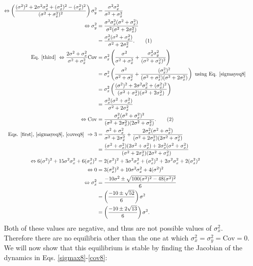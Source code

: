 \documentclass{article}
\newcommand{\Cov}{\text{Cov}}
\newcommand\numberthis{\addtocounter{equation}{1}\tag{\theequation}}
\begin{document}
\begin{enumerate}
\begin{align*}
\\\Leftrightarrow \left(\frac{(\sigma^2)^2+2\sigma^2\sigma_x^2+(\sigma_x^2)^2-(\sigma_x^2)^2}{(\sigma^2+\sigma_x^2)^2}\right)\sigma_y^2&=\frac{\sigma^2\sigma_x^2}{\sigma^2+\sigma_x^2}
\\ \Leftrightarrow \sigma_y^2&=\frac{\sigma^2\sigma_x^2(\sigma^2+\sigma_x^2)}{\sigma^2(\sigma^2+2\sigma_x^2)}
\\&=\frac{\sigma_x^2(\sigma^2+\sigma_x^2)}{\sigma^2+2\sigma_x^2}.  \numberthis \label{sigmayeq8}
\\ \text{Eq. \ref{third} } \Leftrightarrow \frac{2\sigma^2+\sigma_x^2}{\sigma^2+\sigma_x^2}\Cov&=\sigma_x^2\left(\frac{\sigma^2}{\sigma^2+\sigma_x^2}+\frac{\sigma_x^2\sigma_y^2}{(\sigma^2+\sigma_x^2)^2}\right)
\\ &=\sigma_x^2\left(\frac{\sigma^2}{\sigma^2+\sigma_x^2}+\frac{(\sigma_x^2)^2}{(\sigma^2+\sigma_x^2)(\sigma^2+2\sigma_x^2)}\right)  \text{ using Eq. \ref{sigmayeq8}}
\\&=\sigma_x^2\left(\frac{(\sigma^2)^2+2\sigma^2\sigma_x^2+(\sigma_x^2)^2}{(\sigma^2+\sigma_x^2)(\sigma^2+2\sigma_x^2)}\right)
\\&=\frac{\sigma_x^2(\sigma^2+\sigma_x^2)}{\sigma^2+2\sigma_x^2}
\\ \Leftrightarrow \Cov&=\frac{\sigma_x^2(\sigma^2+\sigma_x^2)^2}{(\sigma^2+2\sigma_x^2)(2\sigma^2+\sigma_x^2)}.  \numberthis \label{coveq8}
\\\text{Eqs. \ref{first}, \ref{sigmayeq8}, \ref{coveq8} } \Rightarrow 3&=\frac{\sigma^2+\sigma_x^2}{\sigma^2+2\sigma_x^2}+\frac{2\sigma_x^2(\sigma^2+\sigma_x^2)}{(\sigma^2+2\sigma_x^2)(2\sigma^2+\sigma_x^2)}
\\&=\frac{(\sigma^2+\sigma_x^2)(2\sigma^2+\sigma_x^2)+2\sigma_x^2(\sigma^2+\sigma_x^2)}{(\sigma^2+2\sigma_x^2)(2\sigma^2+\sigma_x^2)}
\\\Leftrightarrow 6(\sigma^2)^2+15\sigma^2\sigma_x^2+6(\sigma_x^2)^2&=2(\sigma^2)^2+3\sigma^2\sigma_x^2+(\sigma_x^2)^2+2\sigma^2\sigma_x^2+2(\sigma_x^2)^2
\\ \Leftrightarrow 0&=3(\sigma_x^2)^2+10\sigma^2\sigma_x^2+4(\sigma^2)^2
\\ \Leftrightarrow \sigma_x^2&=\frac{-10\sigma^2\pm\sqrt{100(\sigma^2)^2-48(\sigma^2)^2}}{6}
\\& = \left(\frac{-10\pm\sqrt{52}}{6}\right)\sigma^2
\\&=\left(\frac{-10\pm 2\sqrt{13}}{6}\right)\sigma^2.
\end{align*}
Both of these values are negative, and thus are not possible values of $\sigma_x^2$. Therefore there are no equilibria other than the one at which $\sigma_x^2=\sigma_y^2=\Cov=0$. We will now show that this equilibrium is stable by finding the Jacobian of the dynamics in Eqs.  \ref{sigmax8}-\ref{cov8}:

\end{enumerate}
\end{document}

